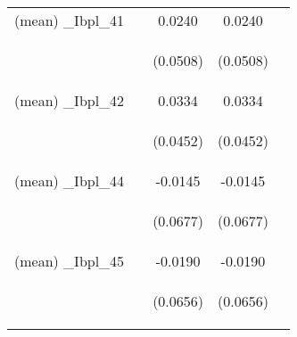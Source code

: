 \documentclass[]{article}
\begin{document}
\begin{center}
\begin{tabular}{lcccc}
(mean) \_Ibpl\_41 &  & 0.0240 & 0.0240 &  \\
\vspace{4pt} & \begin{footnotesize}\end{footnotesize} & \begin{footnotesize}(0.0508)\end{footnotesize} & \begin{footnotesize}(0.0508)\end{footnotesize} & \begin{footnotesize}\end{footnotesize} \\
(mean) \_Ibpl\_42 &  & 0.0334 & 0.0334 &  \\
\vspace{4pt} & \begin{footnotesize}\end{footnotesize} & \begin{footnotesize}(0.0452)\end{footnotesize} & \begin{footnotesize}(0.0452)\end{footnotesize} & \begin{footnotesize}\end{footnotesize} \\
(mean) \_Ibpl\_44 &  & -0.0145 & -0.0145 &  \\
\vspace{4pt} & \begin{footnotesize}\end{footnotesize} & \begin{footnotesize}(0.0677)\end{footnotesize} & \begin{footnotesize}(0.0677)\end{footnotesize} & \begin{footnotesize}\end{footnotesize} \\
(mean) \_Ibpl\_45 &  & -0.0190 & -0.0190 &  \\
\vspace{4pt} & \begin{footnotesize}\end{footnotesize} & \begin{footnotesize}(0.0656)\end{footnotesize} & \begin{footnotesize}(0.0656)\end{footnotesize} & \begin{footnotesize}\end{footnotesize} \\

\end{tabular}
\end{center}
\end{document}
